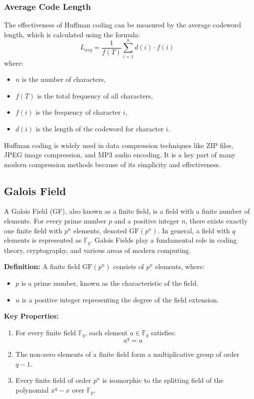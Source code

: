 \subsubsection{Average Code Length}
 
The effectiveness of Huffman coding can be measured by the average codeword length, which is calculated using the formula:
\begin{equation}
L_{avg} = \frac{1}{f(T)} \sum_{i=1}^{n} d(i) \cdot f(i)
\end{equation}
where:
\begin{itemize}
    \item $n$ is the number of characters,
    \item $f(T)$ is the total frequency of all characters,
    \item $f(i)$ is the frequency of character $i$,
    \item $d(i)$ is the length of the codeword for character $i$.
\end{itemize}
 
Huffman coding is widely used in data compression techniques like ZIP files, JPEG image compression, and MP3 audio encoding. It is a key part of many modern compression methods because of its simplicity and effectiveness.
 
\subsection{Galois Field}
 
A Galois Field (GF), also known as a finite field, is a field with a finite number of elements. For every prime number $p$ and a positive integer $n$, there exists exactly one finite field with $p^n$ elements, denoted $\mathrm{GF}(p^n)$. In general, a field with $q$ elements is represented as $\mathbb{F}_q$. Galois Fields play a fundamental role in coding theory, cryptography, and various areas of modern computing.
 
\textbf{Definition:} A finite field $\mathrm{GF}(p^n)$ consists of $p^n$ elements, where:
\begin{itemize}
    \item $p$ is a prime number, known as the characteristic of the field.
    \item $n$ is a positive integer representing the degree of the field extension.
\end{itemize}
 
\textbf{Key Properties:}
\begin{enumerate}
    \item For every finite field $\mathbb{F}_q$, each element $a \in \mathbb{F}_q$ satisfies:
    \begin{equation}
a^q = a
\end{equation}
    \item The non-zero elements of a finite field form a multiplicative group of order $q - 1$.
    \item Every finite field of order $p^n$ is isomorphic to the splitting field of the polynomial $x^q - x$ over $\mathbb{F}_p$.
\end{enumerate}
 
